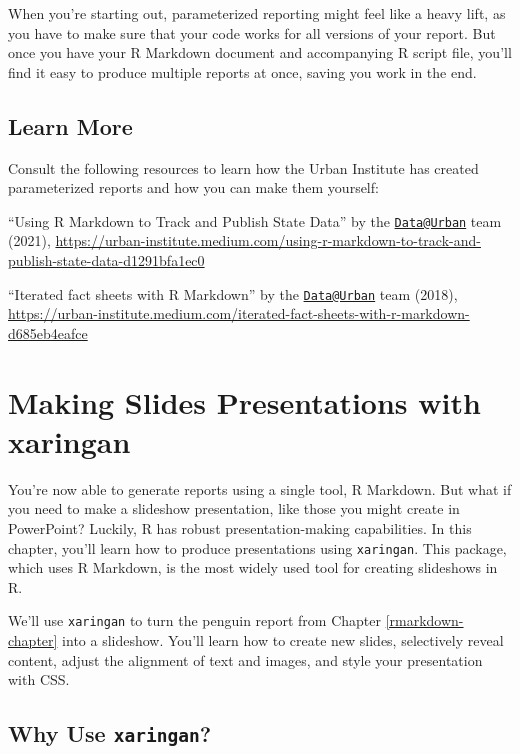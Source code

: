 \documentclass[
]{book}
\begin{document}
When you're starting out, parameterized reporting might feel like a heavy lift, as you have to make sure that your code works for all versions of your report. But once you have your R Markdown document and accompanying R script file, you'll find it easy to produce multiple reports at once, saving you work in the end.

\hypertarget{learn-more-6}{%
\section*{Learn More}\label{learn-more-6}}

Consult the following resources to learn how the Urban Institute has created parameterized reports and how you can make them yourself:

``Using R Markdown to Track and Publish State Data'' by the \href{mailto:Data@Urban}{\nolinkurl{Data@Urban}} team (2021), \url{https://urban-institute.medium.com/using-r-markdown-to-track-and-publish-state-data-d1291bfa1ec0}

``Iterated fact sheets with R Markdown'' by the \href{mailto:Data@Urban}{\nolinkurl{Data@Urban}} team (2018), \url{https://urban-institute.medium.com/iterated-fact-sheets-with-r-markdown-d685eb4eafce}

\hypertarget{presentations-chapter}{%
\chapter{Making Slides Presentations with xaringan}\label{presentations-chapter}}

You're now able to generate reports using a single tool, R Markdown. But what if you need to make a slideshow presentation, like those you might create in PowerPoint? Luckily, R has robust presentation-making capabilities. In this chapter, you'll learn how to produce presentations using \texttt{xaringan}. This package, which uses R Markdown, is the most widely used tool for creating slideshows in R.

We'll use \texttt{xaringan} to turn the penguin report from Chapter \ref{rmarkdown-chapter} into a slideshow. You'll learn how to create new slides, selectively reveal content, adjust the alignment of text and images, and style your presentation with CSS.

\hypertarget{why-use-xaringan}{%
\section*{\texorpdfstring{Why Use \texttt{xaringan}?}{Why Use xaringan?}}\label{why-use-xaringan}}
\end{document}
